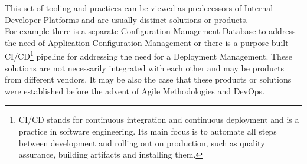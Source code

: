 \documentclass[a4paper,12pt]{article}
\begin{document}
    This set of tooling and practices can be viewed as predecessors of Internal Developer Platforms and are usually
    distinct solutions or products.\\
    For example there is a separate Configuration Management Database to address the need of Application Configuration
    Management or there is a purpose built CI/CD\footnote{CI/CD stands for continuous
    integration and continuous deployment and is a practice in software engineering. Its main focus is to automate all steps
    between development and rolling out on production, such as quality assurance, building artifacts and installing them.}
    pipeline for addressing the need for a Deployment Management.
    These solutions are not necessarily integrated with each other and may be products from different vendors.
    It may be also the case that these products or solutions were established before the advent of Agile Methodologies and DevOps.
\end{document}
